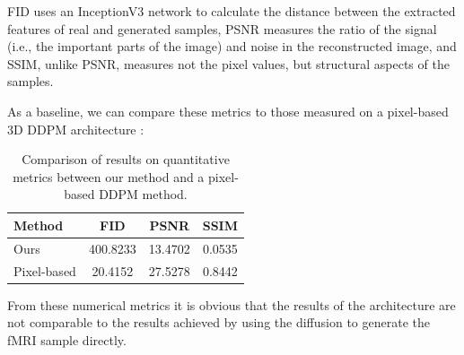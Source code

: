 	
	FID uses an InceptionV3 \cite{szegedy2016rethinking} network to calculate the distance between the extracted features of real and generated samples, PSNR measures the ratio of the signal (i.e., the important parts of the image) and noise in the reconstructed image, and SSIM, unlike PSNR, measures not the pixel values, but structural aspects of the samples.
	
	As a baseline, we can compare these metrics to those measured on a pixel-based 3D DDPM architecture \cite{diff_pixel}:
	
	\begin{table}[!h]
		\begin{center}
			\begin{tabular}{lccc}
				\toprule
				Method & FID & PSNR & SSIM \\
				\midrule
				Ours & 400.8233 & 13.4702 & 0.0535 \\
				Pixel-based & 20.4152 & 27.5278 & 0.8442\\
				\bottomrule
			\end{tabular}
		\end{center}
		\caption{Comparison of results on quantitative metrics between our method and a pixel-based DDPM method.}
	\end{table}
	
	From these numerical metrics it is obvious that the results of the architecture are not comparable to the results achieved by using the diffusion to generate the fMRI sample directly. 
	
